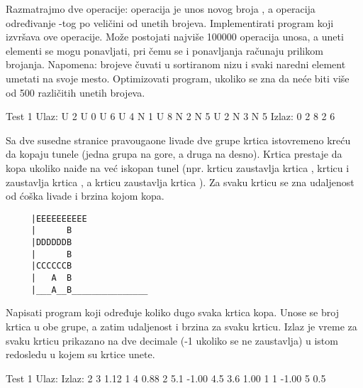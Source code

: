 \begin{Exercise}[label=510]
  Razmatrajmo dve operacije: operacija  je unos novog broja
  , a operacija  određivanje -tog po
  veličini od unetih brojeva. Implementirati program koji izvršava ove
  operacije. Može postojati najviše 100000 operacija unosa, a uneti
  elementi se mogu ponavljati, pri čemu se i ponavljanja računaju
  prilikom brojanja. Napomena: brojeve čuvati u sortiranom nizu i
  svaki naredni element umetati na svoje mesto. Optimizovati program,
  ukoliko se zna da neće biti više od 500 različitih unetih brojeva.
  
\begin{maxitest}
\begin{test}{Test 1}
Ulaz: U 2 U 0 U 6 U 4 N 1 U 8 N 2 N 5 U 2 N 3 N 5
Izlaz: 0 2 8 2 6
\end{test}
\end{maxitest}
  
\end{Exercise}

\begin{Exercise}[label=511]
  Sa dve susedne stranice pravougaone livade dve grupe krtica
  istovremeno kreću da kopaju tunele (jedna grupa na gore, a druga na
  desno). Krtica prestaje da kopa ukoliko naiđe na već iskopan tunel
  (npr. krticu  zaustavlja krtica , krticu  i
   zaustavlja krtica , a krticu  zaustavlja
  krtica ). Za svaku krticu se zna udaljenost od ćoška livade
  i brzina kojom kopa.
\begin{verbatim}
     |EEEEEEEEEE
     |      B
     |DDDDDDB 
     |      B
     |CCCCCCB
     |   A  B
     |___A__B_______________
\end{verbatim}
Napisati program koji određuje koliko dugo svaka krtica kopa. Unose
se broj krtica u obe grupe, a zatim udaljenost i brzina za svaku
krticu. Izlaz je vreme za svaku krticu prikazano na dve decimale (-1
ukoliko se ne zaustavlja) u istom redosledu u kojem su krtice unete.

\begin{miditest}
\begin{test}{Test 1}
Ulaz:          Izlaz:
2 3            1.12
1   4          0.88
2   5.1        -1.00
4.5 3.6        1.00
1   1          -1.00
5   0.5
\end{test}
\end{miditest}
  
\end{Exercise}

